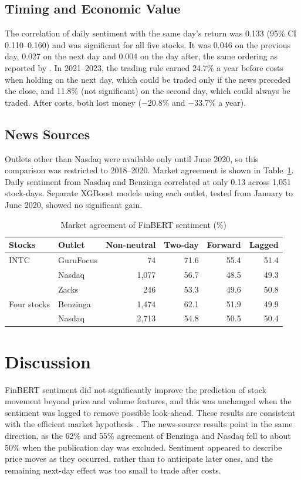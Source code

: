 \documentclass[a4paper,11pt]{article}
\begin{document}
\subsection{Timing and Economic Value}
The correlation of daily sentiment with the same day's return was 0.133 (95\% CI 0.110--0.160) and was significant for all five stocks. It was 0.046 on the previous day, 0.027 on the next day and 0.004 on the day after, the same ordering as reported by \cite{ke2019predicting}. In 2021--2023, the trading rule earned 24.7\% a year before costs when holding on the next day, which could be traded only if the news preceded the close, and 11.8\% (not significant) on the second day, which could always be traded. After costs, both lost money ($-$20.8\% and $-$33.7\% a year).

\subsection{News Sources}
Outlets other than Nasdaq were available only until June 2020, so this comparison was restricted to 2018--2020. Market agreement is shown in Table~\ref{tab:paper-source}. Daily sentiment from Nasdaq and Benzinga correlated at only 0.13 across 1,051 stock-days. Separate XGBoost models using each outlet, tested from January to June 2020, showed no significant gain.

\begin{table}[H]
\centering
\caption{Market agreement of FinBERT sentiment (\%)}
\label{tab:paper-source}
\begin{tabular}{@{}llrrrr@{}}
\toprule
\textbf{Stocks} & \textbf{Outlet} & \textbf{Non-neutral} & \textbf{Two-day} & \textbf{Forward} & \textbf{Lagged} \\
\midrule
INTC & GuruFocus & 74 & 71.6 & 55.4 & 51.4 \\
 & Nasdaq & 1,077 & 56.7 & 48.5 & 49.3 \\
 & Zacks & 246 & 53.3 & 49.6 & 50.8 \\
\midrule
Four stocks & Benzinga & 1,474 & 62.1 & 51.9 & 49.9 \\
 & Nasdaq & 2,713 & 54.8 & 50.5 & 50.4 \\
\bottomrule
\end{tabular}
\end{table}

\section{Discussion}
FinBERT sentiment did not significantly improve the prediction of stock movement beyond price and volume features, and this was unchanged when the sentiment was lagged to remove possible look-ahead. These results are consistent with the efficient market hypothesis \cite{fama1970efficient}. The news-source results point in the same direction, as the 62\% and 55\% agreement of Benzinga and Nasdaq fell to about 50\% when the publication day was excluded. Sentiment appeared to describe price moves as they occurred, rather than to anticipate later ones, and the remaining next-day effect was too small to trade after costs.
\end{document}
